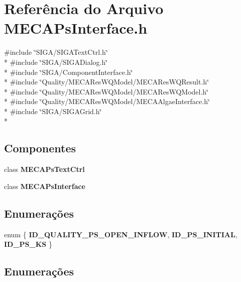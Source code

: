 \section{Referência do Arquivo M\+E\+C\+A\+Ps\+Interface.\+h}
\label{_m_e_c_a_ps_interface_8h}
{\ttfamily \#include \char`\"{}S\+I\+G\+A/\+S\+I\+G\+A\+Text\+Ctrl.\+h\char`\"{}}\\*
{\ttfamily \#include \char`\"{}S\+I\+G\+A/\+S\+I\+G\+A\+Dialog.\+h\char`\"{}}\\*
{\ttfamily \#include \char`\"{}S\+I\+G\+A/\+Component\+Interface.\+h\char`\"{}}\\*
{\ttfamily \#include \char`\"{}Quality/\+M\+E\+C\+A\+Res\+W\+Q\+Model/\+M\+E\+C\+A\+Res\+W\+Q\+Result.\+h\char`\"{}}\\*
{\ttfamily \#include \char`\"{}Quality/\+M\+E\+C\+A\+Res\+W\+Q\+Model/\+M\+E\+C\+A\+Res\+W\+Q\+Model.\+h\char`\"{}}\\*
{\ttfamily \#include \char`\"{}Quality/\+M\+E\+C\+A\+Res\+W\+Q\+Model/\+M\+E\+C\+A\+Algae\+Interface.\+h\char`\"{}}\\*
{\ttfamily \#include \char`\"{}S\+I\+G\+A/\+S\+I\+G\+A\+Grid.\+h\char`\"{}}\\*
\subsection*{Componentes}
\begin{DoxyCompactItemize}
\item 
class {\bf M\+E\+C\+A\+Ps\+Text\+Ctrl}
\item 
class {\bf M\+E\+C\+A\+Ps\+Interface}
\end{DoxyCompactItemize}
\subsection*{Enumerações}
\begin{DoxyCompactItemize}
\item 
enum \{ {\bf I\+D\+\_\+\+Q\+U\+A\+L\+I\+T\+Y\+\_\+\+P\+S\+\_\+\+O\+P\+E\+N\+\_\+\+I\+N\+F\+L\+OW}, 
{\bf I\+D\+\_\+\+P\+S\+\_\+\+I\+N\+I\+T\+I\+AL}, 
{\bf I\+D\+\_\+\+P\+S\+\_\+\+KS}
 \}
\end{DoxyCompactItemize}


\subsection{Enumerações}
